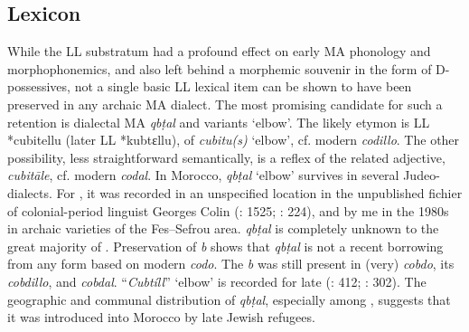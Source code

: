 \documentclass[output=paper]{langsci/langscibook}
\begin{document}
\subsection{Lexicon}

While the LL substratum had a profound effect on early MA phonology and morphophonemics, and also left behind a morphemic souvenir in the form of D-possessives, not a single basic LL lexical item can be shown to have been preserved in any archaic MA dialect. The most promising candidate for such a retention is dialectal MA \textit{qbṭal} and variants ‘elbow’. The likely etymon is LL *cubitellu (later LL *kubtɛllu),  of  \textit{cubitu(s)} ‘elbow’, cf. modern  \textit{codillo}. The other possibility, less straightforward semantically, is a reflex of the related adjective,  \textit{cubitāle}, cf. modern  \textit{codal}. In Morocco, \textit{qbṭal} ‘elbow’ survives in several Judeo- dialects. For , it was recorded in an unspecified location in the unpublished fichier of colonial-period linguist Georges Colin (\citealt{IraquiSinaceur1993}: 1525; \citealt{Prémare1998}: 224), and by me in the 1980s in archaic varieties of the Fes--Sefrou area. \textit{qbṭal} is completely unknown to the great majority of  . Preservation of \textit{b} shows that \textit{qbṭal} is not a recent borrowing from any form based on modern  \textit{codo}. The \textit{b} was still present in (very)   \textit{cobdo}, its  \textit{cobdillo}, and \textit{cobdal}. “\textit{Cubtíll}” ‘elbow’ is recorded for late   (\citealt{Corriente1997dictionary}: 412; \citealt{Dozy1967}: 302). The geographic and communal distribution of \textit{qbṭal}, especially among , suggests that it was introduced into Morocco by late  Jewish refugees. 
\end{document}
